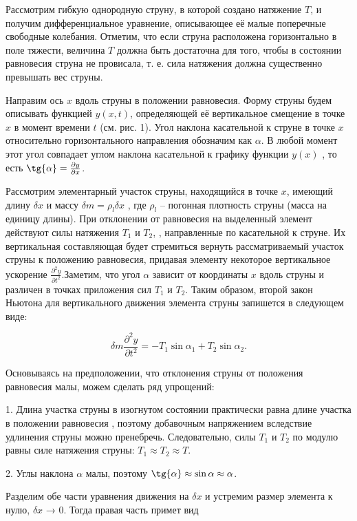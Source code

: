 \documentclass[a4paper, 12pt]{article} %
\begin{document}
Рассмотрим гибкую однородную струну, в которой создано натяжение $T$,
и получим дифференциальное уравнение, описывающее её малые поперечные свободные колебания. Отметим, что если струна расположена горизонтально в поле тяжести, величина $T$ должна быть достаточна для того, чтобы в
состоянии равновесия струна не провисала, т. е. сила натяжения должна существенно превышать вес струны.

Направим ось $x$ вдоль струны в положении равновесия. Форму струны будем описывать функцией $y (x,t)$, определяющей её вертикальное смещение в
точке $x$ в момент времени $t$ (см. рис. 1). Угол наклона касательной к струне в
точке $x$ относительно горизонтального направления обозначим как $\alpha$. В любой момент этот угол совпадает углом наклона касательной к графику функции $y(x)$ , то есть $\tg{\alpha} = \frac{\partial y}{\partial x}$.

Рассмотрим элементарный участок струны, находящийся в точке $x$, имеющий длину $\delta x$ и массу $\delta m = \rho_l \delta x$ , где $\rho_l	$ -- погонная плотность струны
(масса на единицу длины). При отклонении от равновесия на выделенный
элемент действуют силы натяжения $T_1$ и $T_2$, , направленные по касательной к
струне. Их вертикальная составляющая будет стремиться вернуть рассматриваемый участок струны к положению равновесия, придавая элементу некоторое вертикальное ускорение $\frac{\partial^2{y}}{\partial{t^2}}$.Заметим, что угол $\alpha$ зависит от координаты
$x$ вдоль струны и различен в точках приложения сил $T_1$ и $T_2$. Таким образом,
второй закон Ньютона для вертикального движения элемента струны запишется в следующем виде: 

\[ \delta m\frac{\partial^2{y}}{\partial{t^2}} = -T_1\sin{\alpha_1} + T_2\sin{\alpha_2} .\]

Основываясь на предположении, что отклонения струны от положения
равновесия малы, можем сделать ряд упрощений:

1. Длина участка струны в изогнутом состоянии практически равна
длине участка в положении равновесия
, поэтому добавочным напряжением вследствие удлинения струны можно пренебречь. Следовательно, силы $T_1$ и $T_2$ по модулю равны силе натяжения струны: $T_1 \approx T_2 \approx T.$

2. Углы наклона $\alpha$ малы, поэтому $\tg{\alpha} \approx \sin{\alpha} \approx \alpha$.

Разделим обе части уравнения движения на $\delta x$ и устремим размер элемента к нулю, $\delta x$ → 0. Тогда правая часть примет вид
\end{document}
